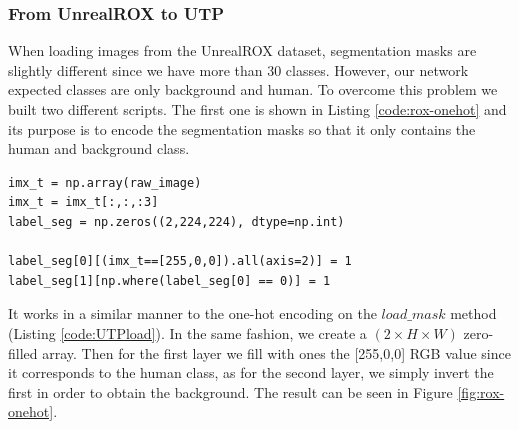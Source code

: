 \subsubsection{From UnrealROX to UTP}
When loading images from the UnrealROX dataset, segmentation masks are slightly different since we have more than 30 classes. However, our network expected classes are only background and human. To overcome this problem we built two different scripts. The first one is shown in Listing \ref{code:rox-onehot} and its purpose is to encode the segmentation masks so that it only contains the human and background class. 

\begin{lstlisting}[style=Python-color, caption=Preprocessing the UnrealROX segmentation masks, frame=single, label=code:rox-onehot]
imx_t = np.array(raw_image)
imx_t = imx_t[:,:,:3]
label_seg = np.zeros((2,224,224), dtype=np.int)

label_seg[0][(imx_t==[255,0,0]).all(axis=2)] = 1
label_seg[1][np.where(label_seg[0] == 0)] = 1

\end{lstlisting}

It works in a similar manner to the one-hot encoding on the $load\_mask$ method (Listing \ref{code:UTPload}). In the same fashion, we create a $(2 \times H \times W)$ zero-filled array. Then for the first layer we fill with ones the [255,0,0] RGB value since it corresponds to the human class, as for the second layer, we simply invert the first in order to obtain the background. The result can be seen in Figure \ref{fig:rox-onehot}.

